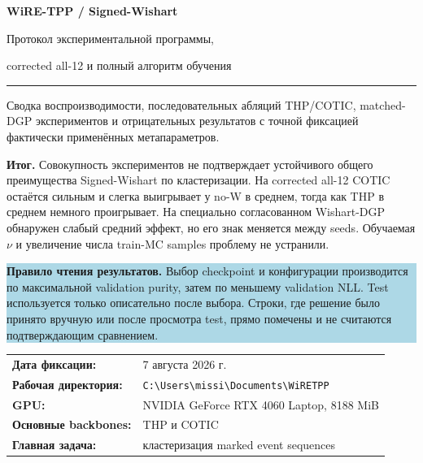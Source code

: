 \documentclass[11pt,a4paper]{article}
\newcommand{\code}[1]{\texttt{#1}}
\newcommand{\boxnote}[2]{%
  \begin{center}\setlength{\fboxsep}{9pt}%
  \colorbox{#1}{\begin{minipage}{0.94\textwidth}\raggedright #2\par\end{minipage}}
  \end{center}}
\newcommand{\verdict}[1]{\boxnote{lightred}{\textbf{Итог.} #1}}
\begin{document}
\begin{titlepage}
  \thispagestyle{empty}
  \vspace*{11mm}
  {\sffamily\bfseries\fontsize{27}{32}\selectfont\color{navy}
    WiRE-TPP / Signed-Wishart\par}
  \vspace{3mm}
  {\sffamily\fontsize{19}{24}\selectfont\color{blue}
    Протокол экспериментальной программы,\par
    corrected all-12 и полный алгоритм обучения\par}
  \vspace{8mm}
  {\color{cyan}\rule{\textwidth}{1.6pt}}
  \vspace{8mm}

  {\large Сводка воспроизводимости, последовательных абляций THP/COTIC,
  matched-DGP экспериментов и отрицательных результатов с точной фиксацией
  фактически применённых метапараметров.}

  \vspace{7mm}
  \verdict{Совокупность экспериментов не подтверждает устойчивого общего
  преимущества Signed-Wishart по кластеризации. На corrected all-12 COTIC
  остаётся сильным и слегка выигрывает у no-W в среднем, тогда как THP в среднем
  немного проигрывает. На специально согласованном Wishart-DGP обнаружен слабый
  средний эффект, но его знак меняется между seeds. Обучаемая $\nu$ и увеличение
  числа train-MC samples проблему не устранили.}

  \vspace{4mm}
  \boxnote{lightblue}{
    \textbf{Правило чтения результатов.} Выбор checkpoint и конфигурации
    производится по максимальной validation purity, затем по меньшему validation
    NLL. Test используется только описательно после выбора. Строки, где решение
    было принято вручную или после просмотра test, прямо помечены и не считаются
    подтверждающим сравнением.
  }

  \vfill
  \begin{tabular}{@{}ll@{}}
    \textbf{Дата фиксации:} & 7 августа 2026 г. \\
    \textbf{Рабочая директория:} & \code{C:\textbackslash Users\textbackslash missi\textbackslash Documents\textbackslash WiRETPP} \\
    \textbf{GPU:} & NVIDIA GeForce RTX 4060 Laptop, 8188 MiB \\
    \textbf{Основные backbones:} & THP и COTIC \\
    \textbf{Главная задача:} & кластеризация marked event sequences \\
  \end{tabular}
  \vspace{8mm}
\end{titlepage}
\end{document}
